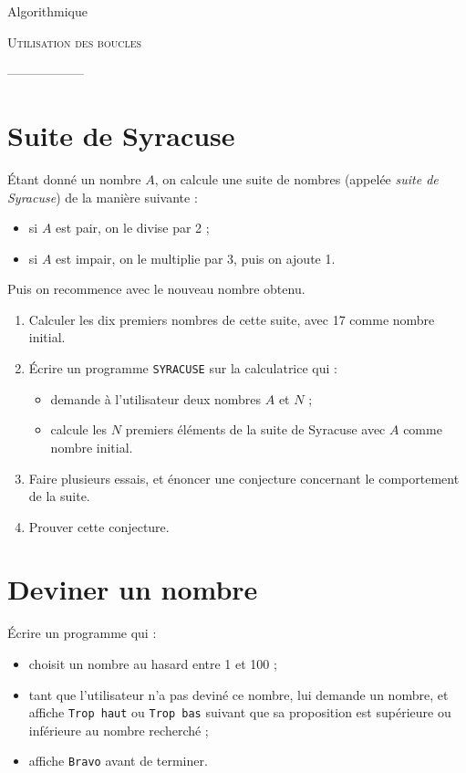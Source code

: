 \documentclass[12pt]{article}
\begin{document}
\begin{center}
  Algorithmique

  {\large
    \textsc{Utilisation des boucles}
  }

  ------------------
\end{center}

\section*{Suite de Syracuse}

Étant donné un nombre $A$, on calcule une suite de nombres (appelée
\emph{suite de Syracuse}) de la manière suivante :
\begin{itemize}
  \item si $A$ est pair, on le divise par 2 ;
  \item si $A$ est impair, on le multiplie par 3, puis on ajoute 1.
\end{itemize}
Puis on recommence avec le nouveau nombre obtenu.

\begin{enumerate}
  \item Calculer les dix premiers nombres de cette suite, avec 17 comme
    nombre initial.
  \item Écrire un programme \texttt{SYRACUSE} sur la calculatrice qui :
    \begin{itemize}
      \item demande à l'utilisateur deux nombres $A$ et $N$ ;
      \item calcule les $N$ premiers éléments de la suite de Syracuse avec
        $A$ comme nombre initial.
    \end{itemize}
    \item Faire plusieurs essais, et énoncer une conjecture concernant le
      comportement de la suite.
    \item Prouver cette conjecture.
\end{enumerate}

\section*{Deviner un nombre}

Écrire un programme qui :
\begin{itemize}
  \item choisit un nombre au hasard entre 1 et 100 ;
  \item tant que l'utilisateur n'a pas deviné ce nombre, lui demande un nombre, et affiche \texttt{Trop haut} ou \texttt{Trop bas} suivant que sa proposition est supérieure ou inférieure au nombre recherché ;
  \item affiche \texttt{Bravo} avant de terminer.
\end{itemize}
\end{document}
